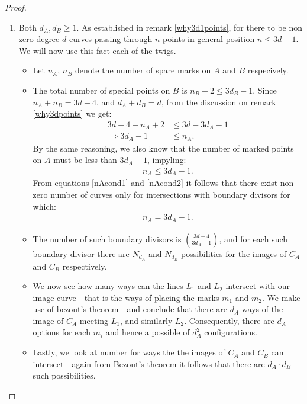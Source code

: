 \begin{proof}
\begin{enumerate}
\begin{enumerate}
        \end{enumerate}
    \item Both $d_{A}, d_{B} \geq 1$.
        As established in remark \ref{why3d1points}, for there to be non zero degree $d$ curves passing through $n$ points in general position $n \leq 3d-1$.
        We will now use this fact each of the twigs.
        \begin{itemize}
            \item Let $n_{A},\, n_{B}$ denote the number of spare marks on $A$ and $B$ respecively.
            \item The total number of special points on $B$ is $n_{B}+2 \leq 3d_{B} - 1$.
                Since $n_{A}+n_{B} = 3d-4$, and $d_{A} + d_{B} = d$, from the discussion on remark \ref{why3dpoints} we get:
                \begin{align}
                    3d-4 - n_{A} +2 &\leq 3d - 3d_{A} -1 \\
                    \Rightarrow 3d_{A} - 1 &\leq n_{A}. \label{nAcond1}
                \end{align}
            By the same reasoning, we also know that the number of marked points on $A$ must be less than $3d_{A} - 1$, impyling:
                \begin{align}
                    n_{A} \leq 3d_{A} - 1. \label{nAcond2}
                \end{align}
            From equations \ref{nAcond1} and  \ref{nAcond2} it follows that there exist non-zero number of curves only for intersections with boundary divisors for which:
                \begin{align*}
                    n_{A} = 3d_{A} - 1.
                \end{align*}
            \item The number of such boundary divisors is $\binom{3d-4}{3d_{A}-1}$, and for each such boundary divisor there are $N_{d_{A}}$ and $N_{d_{B}}$ possibilities for the images of $C_{A}$ and $C_{B}$ respectively.
            \item We now see how many ways can the lines $L_{1}$ and $L_{2}$ intersect with our image curve - that is the ways of placing the marks $m_{1}$ and $m_{2}$.
                We make use of bezout's theorem - and conclude that there are $d_{A}$ ways of the image of $C_{A}$ meeting $L_{1}$, and similarly $L_{2}$.
                Consequently, there are $d_{A}$ options for each $m_{i}$ and hence a possible of $d_{A}^{2}$ configurations.
            \item Lastly, we look at number for ways the the images of $C_{A}$ and $C_{B}$ can intersect - again from Bezout's theorem it follows that there are $d_{A}\cdot d_{B}$ such possibilities.

\end{itemize}
\end{enumerate}
\end{proof}
